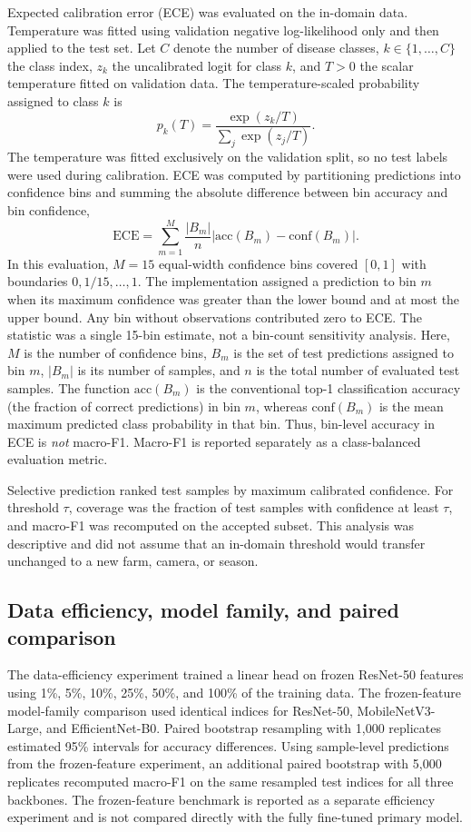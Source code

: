 \documentclass{sbc2023}%
\begin{document}
Expected calibration error (ECE) was evaluated on the in-domain data. Temperature was fitted using validation negative log-likelihood only and then applied to the test set. Let $C$ denote the number of disease classes, $k\in\{1,\ldots,C\}$ the class index, $z_k$ the uncalibrated logit for class $k$, and $T>0$ the scalar temperature fitted on validation data. The temperature-scaled probability assigned to class $k$ is
\begin{equation}
 p_k(T)=\frac{\exp(z_k/T)}{\sum_j \exp(z_j/T)}.
\end{equation}
The temperature was fitted exclusively on the validation split, so no test labels were used during calibration. ECE was computed by partitioning predictions into confidence bins and summing the absolute difference between bin accuracy and bin confidence,
\begin{equation}
 \mathrm{ECE}=\sum_{m=1}^{M}\frac{|B_m|}{n}\left|\mathrm{acc}(B_m)-\mathrm{conf}(B_m)\right|.
\end{equation}
In this evaluation, $M=15$ equal-width confidence bins covered $[0,1]$ with boundaries $0,1/15,\ldots,1$. The implementation assigned a prediction to bin $m$ when its maximum confidence was greater than the lower bound and at most the upper bound. Any bin without observations contributed zero to ECE. The statistic was a single 15-bin estimate, not a bin-count sensitivity analysis. Here, $M$ is the number of confidence bins, $B_m$ is the set of test predictions assigned to bin $m$, $|B_m|$ is its number of samples, and $n$ is the total number of evaluated test samples. The function $\mathrm{acc}(B_m)$ is the conventional top-1 classification accuracy (the fraction of correct predictions) in bin $m$, whereas $\mathrm{conf}(B_m)$ is the mean maximum predicted class probability in that bin. Thus, bin-level accuracy in ECE is \emph{not} macro-F1. Macro-F1 is reported separately as a class-balanced evaluation metric.

Selective prediction ranked test samples by maximum calibrated confidence. For threshold $\tau$, coverage was the fraction of test samples with confidence at least $\tau$, and macro-F1 was recomputed on the accepted subset. This analysis was descriptive and did not assume that an in-domain threshold would transfer unchanged to a new farm, camera, or season.

\subsection{Data efficiency, model family, and paired comparison}
The data-efficiency experiment trained a linear head on frozen ResNet-50 features using 1\%, 5\%, 10\%, 25\%, 50\%, and 100\% of the training data. The frozen-feature model-family comparison used identical indices for ResNet-50, MobileNetV3-Large, and EfficientNet-B0. Paired bootstrap resampling with 1,000 replicates estimated 95\% intervals for accuracy differences. Using sample-level predictions from the frozen-feature experiment, an additional paired bootstrap with 5,000 replicates recomputed macro-F1 on the same resampled test indices for all three backbones. The frozen-feature benchmark is reported as a separate efficiency experiment and is not compared directly with the fully fine-tuned primary model.
\end{document}
